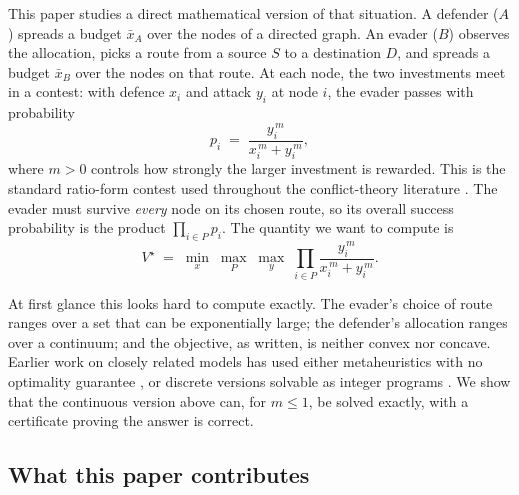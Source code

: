 \documentclass[11pt,a4paper]{article}
\theoremstyle{plain}
\theoremstyle{definition}
\newcommand{\XA}{\bar{x}_A}
\newcommand{\XB}{\bar{x}_B}
\begin{document}
This paper studies a direct mathematical version of that situation. A
defender ($A$) spreads a budget $\XA$ over the nodes of a directed graph.
An evader ($B$) observes the allocation, picks a route from a source $S$
to a destination $D$, and spreads a budget $\XB$ over the nodes on that
route. At each node, the two investments meet in a contest: with defence
$x_i$ and attack $y_i$ at node $i$, the evader passes with probability
\begin{equation}
  p_i \;=\; \frac{y_i^{\,m}}{x_i^{\,m}+y_i^{\,m}},
  \label{eq:csf-intro}
\end{equation}
where $m>0$ controls how strongly the larger investment is rewarded. This
is the standard ratio-form contest used throughout the conflict-theory
literature \citep{tullock1980,skaperdas1996}. The evader must survive
\emph{every} node on its chosen route, so its overall success probability
is the product $\prod_{i\in P} p_i$. The quantity we want to compute is
\begin{equation}
  V^{\star}
  \;=\;
  \min_{x}\;\max_{P}\;\max_{y}\;\prod_{i\in P}\frac{y_i^{\,m}}{x_i^{\,m}+y_i^{\,m}}.
  \label{eq:game-intro}
\end{equation}

At first glance this looks hard to compute exactly. The evader's choice of
route ranges over a set that can be exponentially large; the defender's
allocation ranges over a continuum; and the objective, as written, is
neither convex nor concave. Earlier work on closely related models has
used either metaheuristics with no optimality guarantee
\citep{ramirez2011}, or discrete versions solvable as integer programs
\citep{nguyen2023}. We show that the continuous version above can, for
$m\le 1$, be solved exactly, with a certificate proving the answer is
correct.

\subsection{What this paper contributes}
\end{document}
